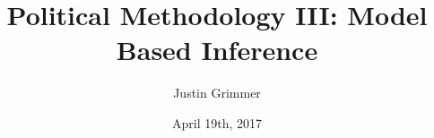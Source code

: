 \documentclass{beamer}
\title[Methodology III] %
{Political Methodology III: Model Based Inference}
\author{Justin Grimmer}
\institute[Stanford University]{Associate Professor\\Department of Political Science \\  Stanford University}
\date{April 19th, 2017}
\begin{document}
\begin{frame}
\titlepage
\end{frame}








\end{document}
